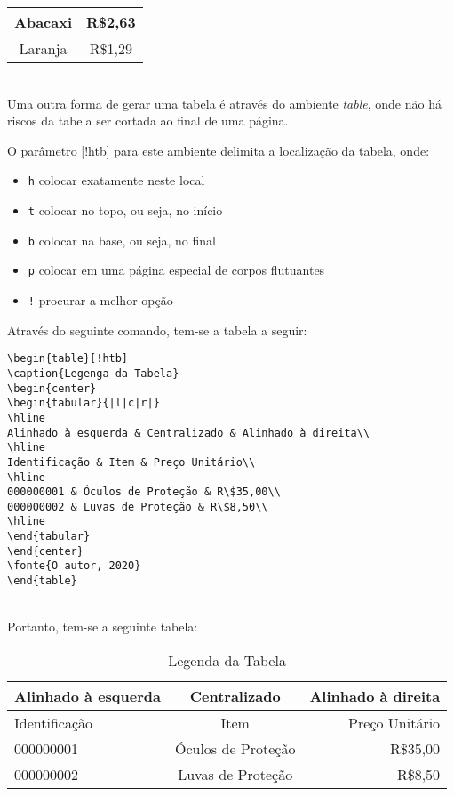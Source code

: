 \begin{tabular}{|c|c|}
\hline
Abacaxi & R\$2,63\\
\hline
Laranja & R\$1,29\\
\hline
\end{tabular}\\

Uma outra forma de gerar uma tabela é através do ambiente \textit{table}, onde não há riscos da tabela ser cortada ao final de uma página.

O parâmetro [!htb] para este ambiente delimita a localização da tabela, onde:\\
\begin{itemize}
\item \verb|h| colocar exatamente neste local
\item \verb|t| colocar no topo, ou seja, no início
\item \verb|b| colocar na base, ou seja, no final
\item \verb|p| colocar em uma página especial de corpos flutuantes
\item \verb|!| procurar a melhor opção
\end{itemize}
Através do seguinte comando, tem-se a tabela a seguir:\\
\begin{verbatim}
\begin{table}[!htb]
\caption{Legenga da Tabela}
\begin{center}
\begin{tabular}{|l|c|r|}
\hline
Alinhado à esquerda & Centralizado & Alinhado à direita\\
\hline
Identificação & Item & Preço Unitário\\
\hline
000000001 & Óculos de Proteção & R\$35,00\\
000000002 & Luvas de Proteção & R\$8,50\\
\hline
\end{tabular}
\end{center}
\fonte{O autor, 2020}
\end{table}
\end{verbatim}\\
Portanto, tem-se a seguinte tabela:\\
\begin{table}[!htb]
\caption{Legenda da Tabela}
\begin{center}
\begin{tabular}{|l|c|r|}
\hline
Alinhado à esquerda & Centralizado & Alinhado à direita\\
\hline
Identificação & Item & Preço Unitário\\
\hline
000000001 & Óculos de Proteção & R\$35,00\\
000000002 & Luvas de Proteção & R\$8,50\\
\hline
\end{tabular}
\end{center}
\end{table}\\
